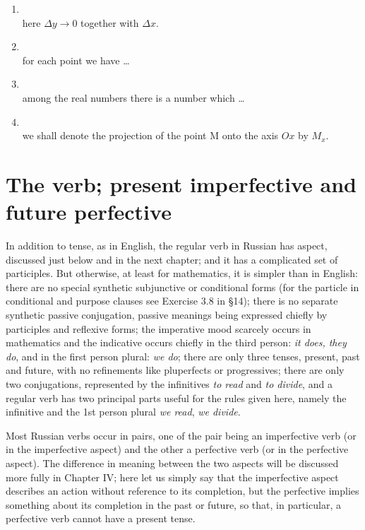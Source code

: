 \begin{enumerate}[label=\arabic*)]
\item {}\\
      here $\Delta y\to0$ together with $\Delta x$.
\item {}\\
      for each point we have \ldots
\item {}\\
      among the real numbers there is a number which \ldots
\item {}\\
      we shall denote the projection of the point M onto the axis $Ox$ by $M_x$.
\end{enumerate}

\section{The verb; present imperfective and future perfective}

In addition to tense, as in English, the regular verb in Russian has aspect, discussed just below and in the next chapter; and it has a complicated set of participles. But otherwise, at least for mathematics, it is simpler than in English: there are no special synthetic subjunctive or conditional forms (for the particle  in conditional and purpose clauses see Exercise 3.8 in §14); there is no separate synthetic passive conjugation, passive meanings being expressed chiefly by participles and reflexive forms; the imperative mood scarcely occurs in mathematics and the indicative occurs chiefly in the third person: \emph{it does, they do}, and in the first person plural: \emph{we do}; there are only three tenses, present, past and future, with no refinements like pluperfects or progressives; there are only two conjugations, represented by the infinitives  \emph{to read} and  \emph{to divide}, and a regular verb has two principal parts useful for the rules given here, namely the infinitive  and the 1st person plural  \emph{we read},  \emph{we divide}.

Most Russian verbs occur in pairs, one of the pair being an imperfective verb (or in the imperfective aspect) and the other a perfective verb (or in the perfective aspect). The difference in meaning between the two aspects will be discussed more fully in Chapter IV; here let us simply say that the imperfective aspect describes an action without reference to its completion, but the perfective implies something about its completion in the past or future, so that, in particular, a perfective verb cannot have a present tense.

